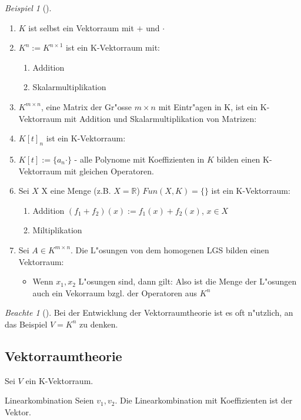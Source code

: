 \documentclass[11pt]{article}
\theoremstyle{remark}
\newtheorem{exa}{Beispiel}[section]
\newtheorem*{notte}{Beachte}
\theoremstyle{definition}
\theoremstyle{remark}
\begin{document}
\begin{exa}[] \label{}
\begin{enumerate}
\item \(K\) ist selbst ein Vektorraum mit \(+\) und \(\cdot\)
\item \(K^{n}:=K^{n\times 1}\) ist ein K-Vektorraum mit:
\begin{enumerate}
\item Addition
\item Skalarmultiplikation
\end{enumerate}
\item \(K^{m \times n}\), eine Matrix der Gr"osse \(m\times n\) mit Eintr"agen in K,
ist ein K-Vektorraum mit Addition und Skalarmultiplikation von Matrizen:
\item \(K[t]_n\) ist ein K-Vektorraum:
\item \(K[t]:=\{a_n\cdot \}\) - alle Polynome mit Koeffizienten in \(K\) bilden einen
K-Vektorraum mit gleichen Operatoren.
\item Sei \(X\) X eine Menge (z.B. \(X=\mathbb{R}\)) \(Fun(X,K)=\{\}\) ist ein K-Vektorraum:
\begin{enumerate}
\item Addition \((f_1 + f_2)(x):= f_1(x)+ f_2(x)\), \(x\in X\)
\item Miltiplikation
\end{enumerate}
\item Sei \(A\in K^{m\times n}\). Die L"osungen von dem homogenen LGS bilden einen
Vektorraum:
\begin{itemize}
\item Wenn \(x_1,x_2\) L"osungen sind, dann gilt: Also ist die Menge der
L"osungen auch ein Vekorraum bzgl. der Operatoren aus \(K^n\)
\end{itemize}
\end{enumerate}
\end{exa}

\begin{notte}[] \label{}
Bei der Entwicklung der Vektorraumtheorie ist es oft n"utzlich, an das Beispiel
\(V=K^n\) zu denken.
\end{notte}

\subsection{Vektorraumtheorie}
\label{sec:org432e282}
Sei \(V\) ein K-Vektorraum.

\begin{definition}{Linearkombination}{}
Seien \(v_1, v_2\). Die Linearkombination mit Koeffizienten ist der Vektor.
\end{definition}
\end{document}
